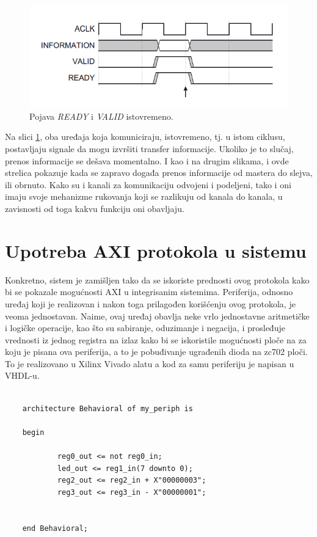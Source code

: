 \documentclass[a4paper, 12pt, diplomski]{etf}
\begin{document}
	\begin{figure}[htb]
		\centering
		\includegraphics[width=.7\textwidth]{images/axi3handshake.png}
		\caption{Pojava \textit{READY} i \textit{VALID} istovremeno. \cite{lit4}}
		\label{fig:axi3hand}
	\end{figure}

	Na slici \ref{fig:axi3hand}, oba uređaja koja komuniciraju, istovremeno, tj. u istom ciklusu, postavljaju signale da mogu izvršiti transfer informacije. Ukoliko je to slučaj, prenos informacije se dešava momentalno. I kao i na drugim slikama, i ovde strelica pokazuje kada se zapravo događa prenos informacije od mastera do slejva, ili obrnuto. Kako su i kanali za komunikaciju odvojeni i podeljeni, tako i oni imaju svoje mehanizme rukovanja koji se razlikuju od kanala do kanala, u zavisnosti od toga kakvu funkciju oni obavljaju.

	\section{Upotreba AXI protokola u sistemu}

	Konkretno, sistem je zamišljen tako da se iskoriste prednosti ovog protokola kako bi se pokazale mogućnosti AXI u integrisanim sistemima. Periferija, odnosno uređaj koji je realizovan i nakon toga prilagođen korišćenju ovog protokola, je veoma jednostavan. Naime, ovaj uređaj obavlja neke vrlo jednostavne aritmetičke i logičke operacije, kao što su sabiranje, oduzimanje i negacija, i prosleđuje vrednosti iz jednog registra na izlaz kako bi se iskoristile mogućnosti ploče na za koju je pisana ova periferija, a to je pobuđivanje ugrađenih dioda na zc702 ploči. To je realizovano u Xilinx Vivado alatu a kod za samu periferiju je napisan u VHDL-u.

	\begin{verbatim}

	architecture Behavioral of my_periph is

	begin

    		reg0_out <= not reg0_in;
    		led_out <= reg1_in(7 downto 0);
    		reg2_out <= reg2_in + X"00000003";
    		reg3_out <= reg3_in - X"00000001";


	end Behavioral;

	\end{verbatim}
\end{document}
